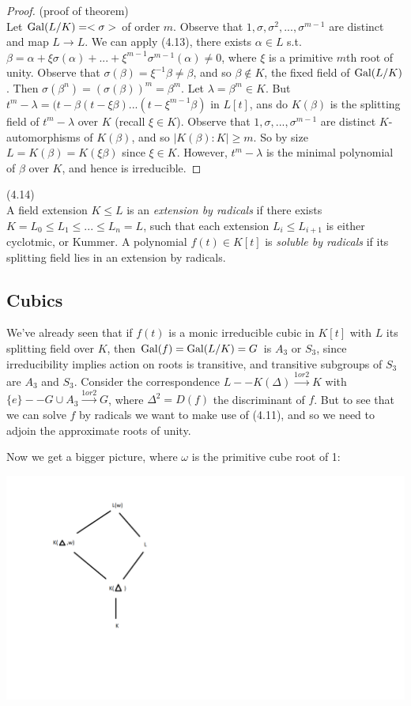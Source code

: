 \documentclass[a4paper]{article}
\begin{document}
\begin{proof} (proof of theorem)\\
Let $\operatorname{Gal}(L/K) = <\sigma>$ of order $m$. Observe that $1,\sigma,\sigma^2,...,\sigma^{m-1}$ are distinct and map $L \to L$. We can apply (4.13), there exists $\alpha \in L$ s.t. $\beta = \alpha+\xi \sigma(\alpha) + ... + \xi^{m-1} \sigma^{m-1}(\alpha) \neq 0$, where $\xi$ is a primitive $m$th root of unity. Observe that $\sigma(\beta) = \xi^{-1} \beta \neq \beta$, and so $\beta \not \in K$, the fixed field of $\operatorname{Gal}(L/K)$. Then $\sigma(\beta^n) = (\sigma(\beta))^m = \beta^m$. Let $\lambda = \beta^m \in K$. But $t^m-\lambda = (t-\beta(t-\xi\beta)...(t-\xi^{m-1}\beta)$ in $L[t]$, ans do $K(\beta)$ is the splitting field of $t^m-\lambda$ over $K$ (recall $\xi \in K$). Observe that $1,\sigma,...,\sigma^{m-1}$ are distinct $K$-automorphisms of $K(\beta)$, and so $|K(\beta):K| \geq m$. So by size $L=K(\beta) = K(\xi\beta)$ since $\xi \in K$. However, $t^m-\lambda$ is the minimal polynomial of $\beta$ over $K$, and hence is irreducible.
\end{proof}

\begin{defi} (4.14)\\
A field extension $K \leq L$ is an \emph{extension by radicals} if there exists $K=L_0 \leq L_1 \leq ... \leq L_n = L$, such that each extension $L_i \leq L_{i+1}$ is either cyclotmic, or Kummer. A polynomial $f(t) \in K[t]$ is \emph{soluble by radicals} if its splitting field lies in an extension by radicals.
\end{defi}

\subsection{Cubics}
We've already seen that if $f(t)$ is a monic irreducible cubic in $K[t]$ with $L$ its splitting field over $K$, then $\operatorname{Gal}(f) = \operatorname{Gal}(L/K) = G$ is $A_3$ or $S_3$, since irreducibility implies action on roots is transitive, and transitive subgroups of $S_3$ are $A_3$ and $S_3$. Consider the correspondence $L -- K(\Delta) \xrightarrow{1 or 2} K$ with $\{e\} -- G \cup A_3 \xrightarrow{1 or 2} G$, where $\Delta^2 = D(f)$ the discriminant of $f$. But to see that we can solve $f$ by radicals we want to make use of (4.11), and so we need to adjoin the approximate roots of unity.

Now we get a bigger picture, where $\omega$ is the primitive cube root of 1:

\includegraphics[scale=0.5]{image/GT_02.png}
\end{document}
